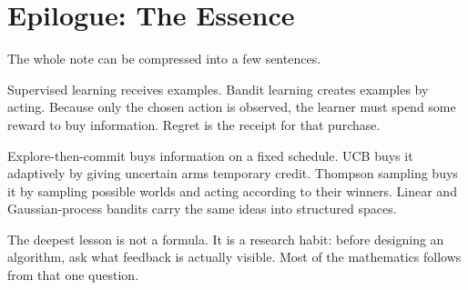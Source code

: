 \documentclass[en,nofont,11pt]{elegantbook}
\begin{document}
\chapter*{Epilogue: The Essence}

The whole note can be compressed into a few sentences.

Supervised learning receives examples. Bandit learning creates examples by acting. Because only the chosen action is observed, the learner must spend some reward to buy information. Regret is the receipt for that purchase.

Explore-then-commit buys information on a fixed schedule. UCB buys it adaptively by giving uncertain arms temporary credit. Thompson sampling buys it by sampling possible worlds and acting according to their winners. Linear and Gaussian-process bandits carry the same ideas into structured spaces.

The deepest lesson is not a formula. It is a research habit: before designing an algorithm, ask what feedback is actually visible. Most of the mathematics follows from that one question.

\backmatter
\printbibliography[heading=bibintoc,title={References}]
\end{document}
